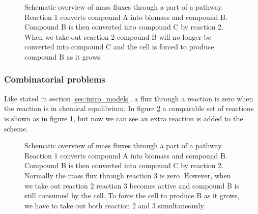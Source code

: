 \documentclass[12pt]{report}
\begin{document}
\begin{figure}[hbtp]
  \centering
     
      \caption{Schematic overview of mass fluxes through a part of a pathway. Reaction 1 converts compound A into biomass and compound B. Compound B is then converted into compound C by reaction 2. When we take out reaction 2 compound B will no longer be converted into compound C and the cell is forced to produce compound B as it grows.}
  \label{fig:reaction-overview1}
\end{figure}

\subsubsection{Combinatorial problems}
Like stated in section \ref{sec:intro_models}, a flux through a reaction is zero when the reaction is in chemical equilibrium. In figure \ref{fig:reaction-overview2} a comparable set of reactions is shown as in figure \ref{fig:reaction-overview1}, but now we can see an extra reaction is added to the scheme.
\begin{figure}[hbtp]
  \centering
     
      \caption{Schematic overview of mass fluxes through a part of a pathway. Reaction 1 converts compound A into biomass and compound B. Compound B is then converted into compound C by reaction 2. Normally the mass flux through reaction 3 is zero. However, when we take out reaction 2 reaction 3 becomes active and compound B is still consumed by the cell. To force the cell to produce B as it grows, we have to take out both reaction 2 and 3 simultaneously.}
  \label{fig:reaction-overview2}
\end{figure}
\end{document}
